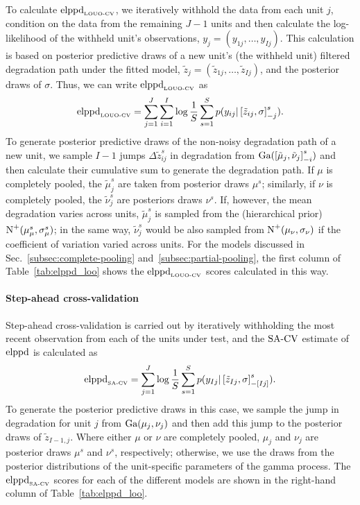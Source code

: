 To calculate $\hbox{elppd}_{\hbox{\tiny{LOUO-CV}}}$, we iteratively withhold the data from each unit $j$, condition on the data from the remaining $J-1$ units and then calculate the log-likelihood of the withheld unit's observations, $y_{j} = (y_{1j}, \ldots, y_{Ij})$. This calculation is based on posterior predictive draws of a new unit's (the withheld unit) filtered degradation path under the fitted model, $\tilde{z}_{j} = (\tilde{z}_{1j}, \ldots, \tilde{z}_{Ij})$, and the posterior draws of $\sigma$. Thus, we can write $\hbox{elppd}_{\hbox{\tiny{LOUO-CV}}}$ as
\begin{equation} \label{eq:elppd_louo}
 \hbox{elppd}_{\hbox{\tiny{LOUO-CV}}} = \sum^J_{j = 1}\sum^{I}_{i = 1} \log \frac{1}{S} \sum^S_{s = 1} p(y_{ij} | \left[\Tilde{z}_{ij}, \sigma \right]_{-j}^s).
\end{equation}
To generate posterior predictive draws of the non-noisy degradation path of a new unit, we sample $I-1$ jumps $\Delta\tilde{z}^s_{ij}$ in degradation from $\hbox{Ga}(\left[\tilde{\mu}_j, \tilde{\nu}_j\right]_{-i}^s)$ and then calculate their cumulative sum to generate the degradation path. If $\mu$ is completely pooled, the $\tilde{\mu}^s_j$ are taken from posterior draws $\mu^s$; similarly, if $\nu$ is completely pooled, the $\tilde{\nu}^s_j$ are posteriors draws $\nu^s$. If, however, the mean degradation varies across units, $\tilde{\mu}^s_j$ is sampled from the (hierarchical prior) $\hbox{N}^{+}(\mu^s_\mu, \sigma^s_\mu)$; in the same way, $\tilde{\nu}^s_j$ would be also sampled from $\hbox{N}^{+}(\mu_\nu, \sigma_\nu)$ if the coefficient of variation varied across units. For the models discussed in Sec.~\ref{subsec:complete-pooling} and~\ref{subsec:partial-pooling}, the first column of Table~\ref{tab:elppd_loo} shows the $\hbox{elppd}_{\hbox{\tiny{LOUO-CV}}}$ scores calculated in this way.

\paragraph{Step-ahead cross-validation}

Step-ahead cross-validation is carried out by iteratively withholding the most recent observation from each of the units under test, and the $\hbox{SA-CV}$ estimate of $\hbox{elppd}$ is calculated as
\begin{equation} \label{eq:elppd_sa_cv}
 \hbox{elppd}_{\hbox{\tiny{SA-CV}}} = \sum^{J}_{j = 1} \log \frac{1}{S} \sum^S_{s = 1} p(y_{Ij} | \left[\tilde{z}_{Ij}, \sigma \right]_{-\left[ Ij \right]}^s).
\end{equation}
To generate the posterior predictive draws in this case, we sample the jump in degradation for unit $j$ from $\hbox{Ga}(\mu_j, \nu_j)$ and then add this jump to the posterior draws of $\tilde{z}_{I-1,j}$. Where either $\mu$ or $\nu$ are completely pooled, $\mu_j$ and $\nu_j$ are posterior draws $\mu^s$ and $\nu^s$, respectively; otherwise, we use the draws from the posterior distributions of the unit-specific parameters of the gamma process. The $\hbox{elppd}_{\hbox{\tiny{SA-CV}}}$ scores for each of the different models are shown in the right-hand column of Table~\ref{tab:elppd_loo}.

